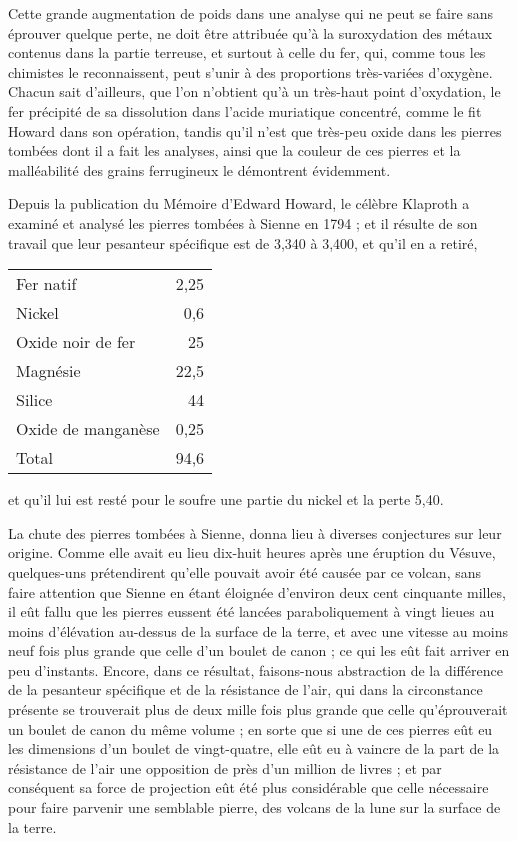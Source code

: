 \documentclass[a4paper, 12pt, oneside, french]{article}
\begin{document}
Cette grande augmentation de poids dans une analyse qui ne peut se faire sans éprouver quelque perte, ne doit être attribuée qu'à la suroxydation des métaux contenus dans la partie terreuse, et surtout à celle du fer, qui, comme tous les chimistes le reconnaissent, peut s'unir à des proportions très-variées d'oxygène. Chacun sait d'ailleurs, que l'on n'obtient qu'à un très-haut point d'oxydation, le fer précipité de sa dissolution dans l'acide muriatique concentré, comme le fit Howard dans son opération, tandis qu'il n'est que très-peu oxide dans les pierres tombées dont il a fait les analyses, ainsi que la couleur de ces pierres et la malléabilité des grains ferrugineux le démontrent évidemment.

Depuis la publication du Mémoire d'Edward Howard, le célèbre Klaproth a examiné et analysé les pierres tombées à Sienne en 1794 ; et il résulte de son travail que leur pesanteur spécifique est de 3,340 à 3,400, et qu'il en a retiré,
\begin{table}[H]
    \centering
    \Fontauri
    \large
    \begin{tabular}{l r}
        Fer natif & 2,25 \\
        Nickel & 0,6 \\
        Oxide noir de fer & 25 \\
        Magnésie & 22,5 \\
        Silice & 44 \\
        Oxide de manganèse & 0,25 \\ \hline
        Total & 94,6 \\
    \end{tabular}
\end{table}
et qu'il lui est resté pour le soufre une partie du nickel et la perte 5,40.

La chute des pierres tombées à Sienne, donna lieu à diverses conjectures sur leur origine. Comme elle avait eu lieu dix-huit heures après une éruption du Vésuve, quelques-uns prétendirent qu'elle pouvait avoir été causée par ce volcan, sans faire attention que Sienne en étant éloignée d'environ deux cent cinquante milles, il eût fallu que les pierres eussent été lancées paraboliquement à vingt lieues au moins d'élévation au-dessus de la surface de la terre, et avec une vitesse au moins neuf fois plus grande que celle d'un boulet de canon ; ce qui les eût fait arriver en peu d'instants. Encore, dans ce résultat, faisons-nous abstraction de la différence de la pesanteur spécifique et de la résistance de l'air, qui dans la circonstance présente se trouverait plus de deux mille fois plus grande que celle qu'éprouverait un boulet de canon du même volume ; en sorte que si une de ces pierres eût eu les dimensions d'un boulet de vingt-quatre, elle eût eu à vaincre de la part de la résistance de l'air une opposition de près d'un million de livres ; et par conséquent sa force de projection eût été plus considérable que celle nécessaire pour faire parvenir une semblable pierre, des volcans de la lune sur la surface de la terre.
\end{document}
